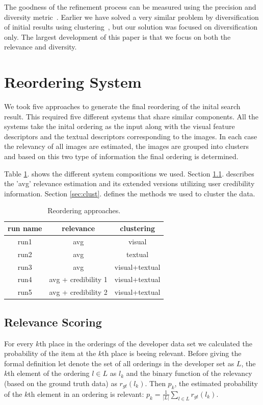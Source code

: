 \documentclass{acm_proc_article-me}
\begin{document}
The goodness of the refinement process can be measured using the precision and diversity metric~\cite{Taneva:2010:GRP:1718487.1718541}. Earlier we have solved a very similar problem by diversification of initial results using clustering~\cite{szHucs2013bmemtm}, but our solution was focused on diversification only. The largest development of this paper is that we focus on both the relevance and diversity.

\section{Reordering System}

We took five approaches to generate the final reordering of the inital search result. This required five different systems that share similar components. All the systems take the inital ordering as the input along with the visual feature descriptors and the textual descriptors corresponding to the images. In each case the relevancy of all images are estimated, the images are grouped into clusters and based on this two type of information the final ordering is determined.

Table \ref{table:runs}. shows the different system compositions we used. Section \ref{sec:relevance}. describes the 'avg' relevance estimation and its extended versions utilizing user credibility information. Section \ref{sec:clust}. defines the methods we used to cluster the data.

\begin{table}[h]
\centering
\begin{tabular}{|c|c|c|}
	\hline 
	run name & relevance & clustering\tabularnewline
	\hline 
	\hline 
	run1 & avg & visual\tabularnewline
	\hline 
	run2 & avg & textual\tabularnewline
	\hline 
	run3 & avg & visual+textual\tabularnewline
	\hline 
	run4 & avg + credibility 1 & visual+textual\tabularnewline
	\hline 
	run5 & avg + credibility 2 & visual+textual\tabularnewline
	\hline 
\end{tabular}
\caption{Reordering approaches.}
\label{table:runs}
\end{table}

\subsection{Relevance Scoring}
\label{sec:relevance}

For every $k$th place in the orderings of the developer data set we calculated the probability of the item at the $k$th place is beeing relevant. Before giving the formal definition let denote the set of all orderings in the developer set as $L$, the $k$th element of the ordering $l \in L$ as $l_k$ and the binary function of the relevancy (based on the ground truth data) as $r_{gt}(l_k)$. Then $p_k$, the estimated probability of the $k$th element in an ordering is relevant:
$p_k = \frac{1}{|L|}\sum_{l \in L}r_{gt}(l_k)$.
\end{document}
